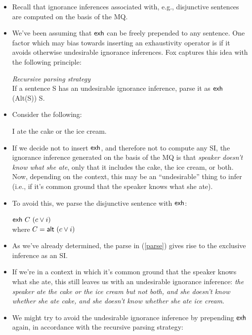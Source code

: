 \documentclass[landscape,cronos,paper=letter]{ling-handout}
\begin{document}
\begin{itemize}

\item Recall that ignorance inferences associated with, e.g., disjunctive sentences are computed on the basis of the MQ.

\item We've been assuming that $\textsf{exh}$ can be freely prepended to any sentence. One factor which may bias towards inserting an exhaustivity operator is if it avoids otherwise undesirable ignorance inferences. Fox captures this idea with the following principle:

\ex
\textit{Recursive parsing strategy}\\
If a sentence S has an undesirable ignorance inference, parse it as $\textsf{exh}$ (Alt(S)) S.
\xe

\item Consider the following:

\ex
I ate the cake or the ice cream.
\xe

\item If we decide not to insert $\textsf{exh}$, and therefore not to compute any SI, the ignorance inference generated on the basis of the MQ is that \textit{speaker doesn't know what she ate}, only that it includes the cake, the ice cream, or both. Now, depending on the context, this may be an \enquote{undesirable} thing to infer (i.e., if it's common ground that the speaker knows what she ate).

\item To avoid this, we parse the disjunctive sentence with $\textsf{exh}$:

\ex\label{parse}$\ml{exh} C (c \vee i)$\\
where $C = \ml{alt} (c \vee i)$
\xe

\item As we've already determined, the parse in (\ref{parse}) gives rise to the exclusive inference as an SI.

\item If we're in a context in which it's common ground that the speaker knows what she ate, this still leaves us with an undesirable ignorance inference: \textit{the speaker ate the cake or the ice cream but not both, and she doesn't know whether she ate cake, and she doesn't know whether she ate ice cream}.

\item We might try to avoid the undesirable ignorance inference by prepending $\textsf{exh}$ again, in accordance with the recursive parsing strategy:


\end{itemize}
\end{document}

